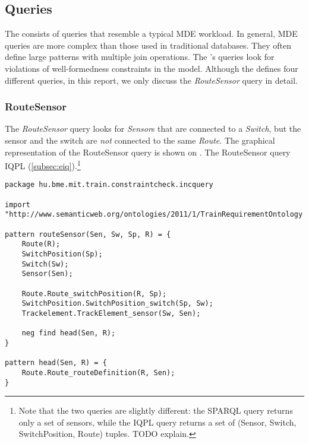 \subsection{Queries}

The \tb{} consists of queries that resemble a typical MDE workload. In general, MDE queries are more complex than those used in traditional databases. They often define large patterns with multiple join operations. The \tb{}'s queries look for violations of well-formedness constraints in the model. Although the \tb{} defines four different queries, in this report, we only discuss the \textit{RouteSensor} query in detail.

\subsubsection{RouteSensor}


The \textit{RouteSensor} query looks for \textit{Sensor}s that are connected to a \textit{Switch}, but the sensor and the switch are \emph{not} connected to the same \textit{Route}. The graphical representation of the RouteSensor query is shown on . The RouteSensor query  IQPL (\autoref{subsec:eiq}).\footnote{Note that the two queries are slightly different: the SPARQL query returns only a set of sensors, while the IQPL query returns a set of (Sensor, Switch, SwitchPosition, Route) tuples. TODO explain.}

\lstset{language=viatra}

\begin{lstlisting}[caption=The \emph{RouteSensor} query in IQPL, label=lst:routesensor-iqpl]
package hu.bme.mit.train.constraintcheck.incquery

import "http://www.semanticweb.org/ontologies/2011/1/TrainRequirementOntology.owl" 

pattern routeSensor(Sen, Sw, Sp, R) = {
	Route(R);
	SwitchPosition(Sp);
	Switch(Sw);
	Sensor(Sen);
	
	Route.Route_switchPosition(R, Sp);
	SwitchPosition.SwitchPosition_switch(Sp, Sw);
	Trackelement.TrackElement_sensor(Sw, Sen);
	
	neg find head(Sen, R);	
}

pattern head(Sen, R) = {
	Route.Route_routeDefinition(R, Sen);
}
\end{lstlisting}


